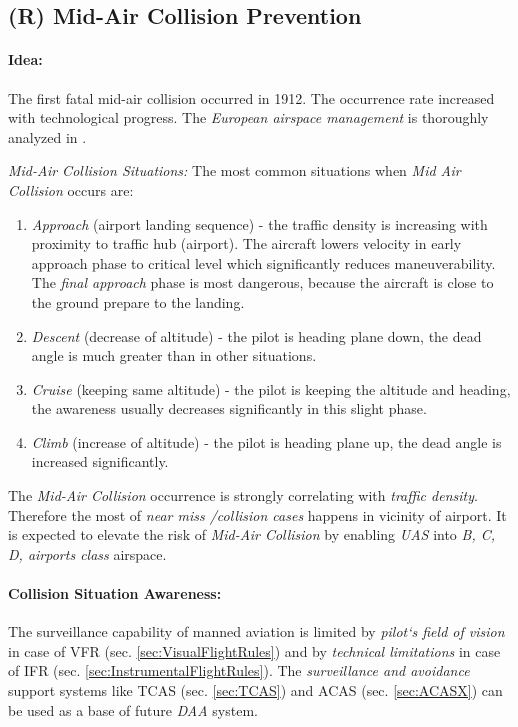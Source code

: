 \subsection{(R) Mid-Air Collision Prevention}\label{sec:MidairCollisionPrevention}
\paragraph{Idea:} The first fatal mid-air collision occurred in 1912. The occurrence rate increased with technological progress. The \emph{European airspace management} is thoroughly analyzed in \cite{cook2007european}. 

\emph{Mid-Air Collision Situations:} The most common situations when \emph{Mid Air Collision} occurs are:

\begin{enumerate}
    \item \emph{Approach} (airport landing sequence) - the traffic density is increasing with proximity to traffic hub (airport). The aircraft lowers velocity in early approach phase to critical level which significantly reduces maneuverability. The \emph{final approach} phase is most dangerous, because the aircraft is close to the ground prepare to the landing.  
    
    \item \emph{Descent} (decrease of altitude) - the pilot is heading plane down, the dead angle is much greater than in other situations.
    
    \item \emph{Cruise}  (keeping same altitude) - the pilot is  keeping the altitude and heading, the awareness usually decreases significantly in this slight phase. 

    \item \emph{Climb} (increase of altitude) - the pilot is heading plane up, the dead angle is increased significantly. 
\end{enumerate}

\begin{note}
    The \emph{Mid-Air Collision} occurrence is strongly correlating with \emph{traffic density}. Therefore the most of \emph{near miss /collision cases} happens in vicinity of airport. It is expected to elevate the risk of \emph{Mid-Air Collision} by enabling \emph{UAS} into \emph{B, C, D, airports class}  airspace.
\end{note}

\paragraph{Collision Situation Awareness:} The surveillance capability of manned aviation is limited by \emph{pilot`s field of vision} in case of VFR (sec. \ref{sec:VisualFlightRules}) and by \emph{technical limitations} in case of IFR (sec. \ref{sec:InstrumentalFlightRules}). The \emph{surveillance and avoidance} support systems like TCAS (sec. \ref{sec:TCAS}) and ACAS (sec. \ref{sec:ACASX}) can be used as a base of future \emph{DAA} system.

